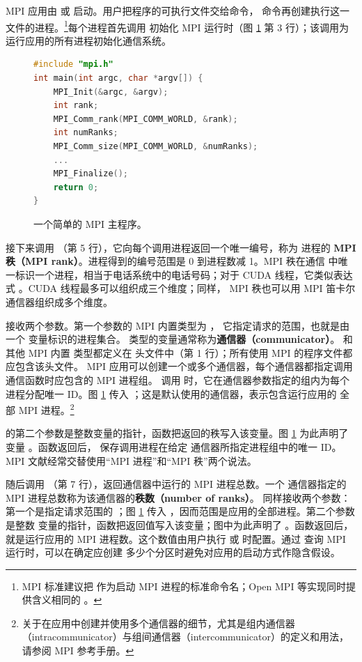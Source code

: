 MPI 应用由  或  启动。用户把程序的可执行文件交给命令，
命令再创建执行这一文件的进程。\footnote{MPI 标准建议把  作为启动 MPI
进程的标准命令名；Open MPI 等实现同时提供含义相同的 。}每个进程首先调用
 初始化 MPI
运行时（图 \ref{fig:23-6} 第 3 行）；该调用为运行应用的所有进程初始化通信系统。

\begin{figure}[htbp]
  \centering
  \begin{lstlisting}[language=C,basicstyle=\ttfamily\scriptsize,firstnumber=1]
#include "mpi.h"
int main(int argc, char *argv[]) {
    MPI_Init(&argc, &argv);
    int rank;
    MPI_Comm_rank(MPI_COMM_WORLD, &rank);
    int numRanks;
    MPI_Comm_size(MPI_COMM_WORLD, &numRanks);
    ...
    MPI_Finalize();
    return 0;
}
  \end{lstlisting}
  \caption{一个简单的 MPI 主程序。}
  \label{fig:23-6}
\end{figure}

接下来调用 （第 5 行），它向每个调用进程返回一个唯一编号，称为
进程的 \textbf{MPI 秩（MPI rank）}。进程得到的编号范围是 0 到进程数减 1。MPI 秩在通信
中唯一标识一个进程，相当于电话系统中的电话号码；对于 CUDA 线程，它类似表达式
。CUDA 线程最多可以组织成三个维度；同样，
MPI 秩也可以用 MPI 笛卡尔通信器组织成多个维度。

 接收两个参数。第一个参数的 MPI 内置类型为 ，
它指定请求的范围，也就是由一个  变量标识的进程集合。
类型的变量通常称为\textbf{通信器（communicator）}。 和其他 MPI 内置
类型都定义在  头文件中（第 1 行）；所有使用 MPI 的程序文件都应包含该头文件。
MPI 应用可以创建一个或多个通信器，每个通信器都指定调用通信函数时应包含的 MPI 进程组。
调用  时，它在通信器参数指定的组内为每个进程分配唯一 ID。图
\ref{fig:23-6} 传入 ；这是默认使用的通信器，表示包含运行应用的
全部 MPI 进程。\footnote{关于在应用中创建并使用多个通信器的细节，尤其是组内通信器
（intracommunicator）与组间通信器（intercommunicator）的定义和用法，请参阅 MPI
参考手册\cite{ch23-mpi}。}

 的第二个参数是整数变量的指针，函数把返回的秩写入该变量。图
\ref{fig:23-6} 为此声明了变量 。函数返回后， 保存调用进程在给定
通信器所指定进程组中的唯一 ID。MPI 文献经常交替使用“MPI 进程”和“MPI 秩”两个说法。

随后调用 （第 7 行），返回通信器中运行的 MPI 进程总数。一个
通信器指定的 MPI 进程总数称为该通信器的\textbf{秩数（number of ranks）}。
 同样接收两个参数：第一个是指定请求范围的 ；图
\ref{fig:23-6} 传入 ，因而范围是应用的全部进程。第二个参数是整数
变量的指针，函数把返回值写入该变量；图中为此声明了 。函数返回后，
 就是运行应用的 MPI 进程数。这个数值由用户执行  或
 时配置。通过  查询 MPI 运行时，可以在确定应创建
多少个分区时避免对应用的启动方式作隐含假设。

